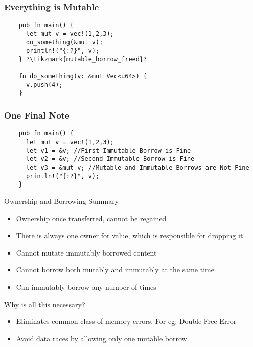 \begin{frame}[fragile]
  \frametitle{Everything is Mutable}
  \begin{verbatim}
    pub fn main() {
      let mut v = vec!(1,2,3);
      do_something(&mut v);
      println!("{:?}", v);
    } ?\tikzmark{mutable_borrow_freed}?

    fn do_something(v: &mut Vec<u64>) {
      v.push(4);
    }
  \end{verbatim}
\end{frame}

\begin{frame}[fragile]
  \frametitle{One Final Note \cite{RustLangCh4}}
  \begin{verbatim}
    pub fn main() {
      let mut v = vec!(1,2,3);
      let v1 = &v; //First Immutable Borrow is Fine
      let v2 = &v; //Second Immutable Borrow is Fine
      let v3 = &mut v; //Mutable and Immutable Borrows are Not Fine
      println!("{:?}", v);
    }
  \end{verbatim}
\end{frame}

\begin{frame}{Ownership and Borrowing Summary}
  \begin{itemize}
  \item Ownership once transferred, cannot be regained
  \item There is always one owner for value, which is responsible for dropping it
  \item Cannot mutate immutably borrowed content
  \item Cannot borrow both mutably and immutably at the same time
  \item Can immutably borrow any number of times
  \end{itemize}
\end{frame}

\begin{frame}{Why is all this necessary?}
  \begin{itemize}
  \item Eliminates common class of memory errors. For eg: Double Free Error
  \item Avoid data races by allowing only one mutable borrow
  \end{itemize}
\end{frame}
